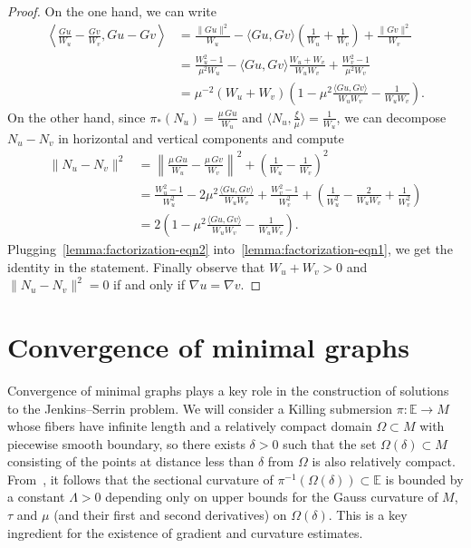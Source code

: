 \documentclass[a4paper,10pt,reqno]{amsart}
\newcommand{\E}{\mathbb{E}}
\theoremstyle{definition}
\theoremstyle{remark}
\numberwithin{equation}{section}
\begin{document}
\begin{proof} On the one hand, we can write
\begin{equation}\label{lemma:factorization-eqn1}
\begin{aligned}
	\left\langle\frac{Gu}{W_u}-\frac{Gv}{W_v},Gu-Gv\right\rangle&=\frac{\|Gu\|^2}{W_u}-\langle Gu,Gv\rangle\left(\frac{1}{W_u}+\frac{1}{W_v}\right)+\frac{\|Gv\|^2}{W_v}\\
	&=\frac{W_u^2-1}{\mu^2W_u}-\langle Gu,Gv\rangle\frac{W_u+W_v}{W_uW_v}+\frac{W_v^2-1}{\mu^2W_v}\\
	&=\mu^{-2}(W_u+W_v)\left(1-\mu^2\frac{\langle Gu,Gv\rangle}{W_uW_v}-\frac{1}{W_uW_v}\right).
\end{aligned}
\end{equation}
On the other hand, since $\pi_*(N_u)=\frac{\mu\, Gu}{W_u}$ and $\langle N_u,\frac{\xi}{\mu}\rangle=\frac{1}{W_u}$, we can decompose $N_u-N_v$ in horizontal and vertical components and compute
\begin{equation}\label{lemma:factorization-eqn2}
\begin{aligned}
	\|N_u-N_v\|^2&=\left\|\frac{\mu \,Gu}{W_u}-\frac{\mu\,Gv}{W_v}\right\|^2+\left(\frac{1}{W_u}-\frac{1}{W_v}\right)^2\\
	&=\frac{W_u^2-1}{W_u^2}-2\mu^2\frac{\langle Gu,Gv\rangle}{W_uW_v}+\frac{W_v^2-1}{W_v^2}+\left(\frac{1}{W_u^2}-\frac{2}{W_uW_v}+\frac{1}{W_v^2}\right)\\
	&=2\left(1-\mu^2\frac{\langle Gu,Gv\rangle}{W_uW_v}-\frac{1}{W_uW_v}\right).
\end{aligned}
\end{equation}
Plugging~\eqref{lemma:factorization-eqn2} into~\eqref{lemma:factorization-eqn1}, we get the identity in the statement. Finally observe that $W_u+W_v>0$ and $\|N_u-N_v\|^2=0$ if and only if $\nabla u=\nabla v$.
\end{proof}


\section{Convergence of minimal graphs}\label{sec:convergence}

Convergence of minimal graphs plays a key role in the construction of solutions to the Jenkins--Serrin problem. We will consider a Killing submersion $\pi\colon\E\to M$ whose fibers have infinite length and a relatively compact domain $\Omega\subset M$ with piecewise smooth boundary, so there exists $\delta>0$ such that the set $\Omega(\delta)\subset M$ consisting of the points at distance less than $\delta$ from $\Omega$ is also relatively compact. From~\cite[Prop.~2.6]{DLM}, it follows that the sectional curvature of $\pi^{-1}(\Omega(\delta))\subset\E$ is bounded by a constant $\Lambda>0$ depending only on upper bounds for the Gauss curvature of $M$, $\tau$ and $\mu$ (and their first and second derivatives) on $\Omega(\delta)$. This is a key ingredient for the existence of gradient and curvature estimates.
\end{document}
